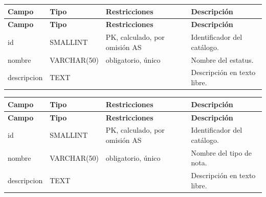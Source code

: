 \begin{xltabular}{\linewidth}{@{}>{\ttfamily\footnotesize}p{4.9cm}>{\ttfamily\footnotesize}p{2.4cm}>{\raggedright\arraybackslash\footnotesize}p{3.3cm}>{\footnotesize}X@{}}
\toprule\normalfont\sffamily\bfseries\footnotesize Campo & \normalfont\sffamily\bfseries\footnotesize Tipo & \sffamily\bfseries Restricciones & \sffamily\bfseries Descripción\\\midrule\endfirsthead
\toprule\normalfont\sffamily\bfseries\footnotesize Campo & \normalfont\sffamily\bfseries\footnotesize Tipo & \sffamily\bfseries Restricciones & \sffamily\bfseries Descripción\\\midrule\endhead
\bottomrule\endfoot
id & SMALLINT & PK, calculado, por omisión AS & Identificador del catálogo.\\
nombre & VARCHAR(50) & obligatorio, único & Nombre del estatus.\\
descripcion & TEXT &  & Descripción en texto libre.\\
\end{xltabular}

\begin{xltabular}{\linewidth}{@{}>{\ttfamily\footnotesize}p{4.9cm}>{\ttfamily\footnotesize}p{2.4cm}>{\raggedright\arraybackslash\footnotesize}p{3.3cm}>{\footnotesize}X@{}}
\toprule\normalfont\sffamily\bfseries\footnotesize Campo & \normalfont\sffamily\bfseries\footnotesize Tipo & \sffamily\bfseries Restricciones & \sffamily\bfseries Descripción\\\midrule\endfirsthead
\toprule\normalfont\sffamily\bfseries\footnotesize Campo & \normalfont\sffamily\bfseries\footnotesize Tipo & \sffamily\bfseries Restricciones & \sffamily\bfseries Descripción\\\midrule\endhead
\bottomrule\endfoot
id & SMALLINT & PK, calculado, por omisión AS & Identificador del catálogo.\\
nombre & VARCHAR(50) & obligatorio, único & Nombre del tipo de nota.\\
descripcion & TEXT &  & Descripción en texto libre.\\
\end{xltabular}


